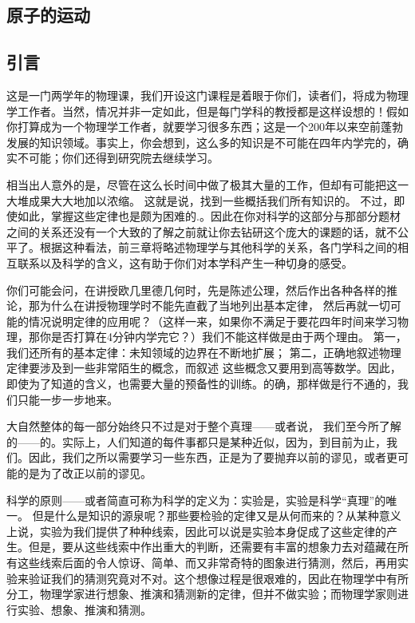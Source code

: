 \documentclass[12pt,oneside]{book}
\begin{document}
\begin{common-format}
\mainmatter

\chapter{原子的运动}

\section{引言}
这是一门两学年的物理课，我们开设这门课程是着眼于你们，读者们，将成为物理学工作者。当然，情况并非一定如此，但是每门学科的教授都是这样设想的！假如你打算成为一个物理学工作者，就要学习很多东西；这是一个200年以来空前蓬勃发展的知识领域。事实上，你会想到，这么多的知识是不可能在四年内学完的，确实不可能；你们还得到研究院去继续学习。

相当出人意外的是，尽管在这么长时间中做了极其大量的工作，但却有可能把这一大堆成果大大地加以浓缩。 这就是说，找到一些概括我们所有知识的。 不过，即使如此，掌握这些定律也是颇为困难的.。因此在你对科学的这部分与那部分题材之间的关系还没有一个大致的了解之前就让你去钻研这个庞大的课题的话，就不公平了。根据这种看法，前三章将略述物理学与其他科学的关系，各门学科之间的相互联系以及科学的含义，这有助于你们对本学科产生一种切身的感受。

你们可能会问，在讲授欧几里德几何时，先是陈述公理，然后作出各种各样的推论，那为什么在讲授物理学时不能先直截了当地列出基本定律， 然后再就一切可能的情况说明定律的应用呢？（这样一来，如果你不满足于要花四年时间来学习物理，那你是否打算在4分钟内学完它？）我们不能这样做是由于两个理由。 第一，我们还所有的基本定律：未知领域的边界在不断地扩展； 第二，正确地叙述物理定律要涉及到一些非常陌生的概念，而叙述
这些概念又要用到高等数学。因此，即使为了知道的含义，也需要大量的预备性的训练。的确，那样做是行不通的，我们只能一步一步地来。

大自然整体的每一部分始终只不过是对于整个真理——或者说， 我们至今所了解的——的。实际上，人们知道的每件事都只是某种近似，因为，到目前为止，我们。因此，我们之所以需要学习一些东西，正是为了要抛弃以前的谬见，或者更可能的是为了改正以前的谬见。

科学的原则——或者简直可称为科学的定义为：实验是，实验是科学“真理”的唯一。 但是什么是知识的源泉呢？那些要检验的定律又是从何而来的？从某种意义上说，实验为我们提供了种种线索，因此可以说是实验本身促成了这些定律的产生。但是，要从这些线索中作出重大的判断，还需要有丰富的想象力去对蕴藏在所有这些线索后面的令人惊讶、简单、而又非常奇特的图象进行猜测，然后，再用实验来验证我们的猜测究竟对不对。这个想像过程是很艰难的，因此在物理学中有所分工，物理学家进行想象、推演和猜测新的定律，但并不做实验；而物理学家则进行实验、想象、推演和猜测。


\end{common-format}
\end{document}
